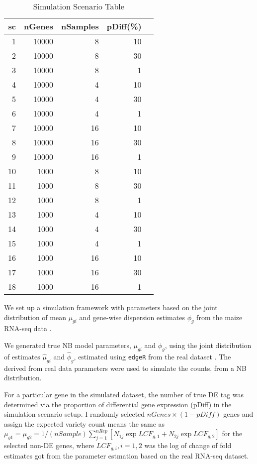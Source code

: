 \begin{table}[H]
\centering
\begin{tabular}{|r|r|r|r|r|}
\hline
sc & nGenes & nSamples & pDiff(\%) \\ 
\hline
1 & 10000 & 8 & 10 \\ 
\hline
2 & 10000 & 8 & 30 \\ 
\hline
3 & 10000 & 8 & 1 \\
\hline
4 & 10000 & 4 & 10 \\
\hline
5 & 10000 & 4 & 30 \\
\hline
6 & 10000 & 4 & 1 \\ 
\hline
7 & 10000 & 16 & 10 \\
\hline
8 & 10000 & 16 & 30 \\ 
\hline
9 & 10000 & 16 & 1 \\
\hline
10& 1000 & 8 & 10 \\
\hline
11 & 1000 & 8 & 30 \\
\hline
12 & 1000 & 8 & 1 \\ 
\hline
13 & 1000 & 4 & 10 \\
\hline
14 & 1000 & 4 & 30 \\
\hline
15 & 1000 & 4 & 1 \\ 
\hline
16 & 1000 & 16 & 10 \\
\hline
17 & 1000 & 16 & 30 \\ 
\hline
18 & 1000 & 16 & 1 \\ 
\hline
\end{tabular}
\caption{Simulation Scenario Table}
\label{tab:Scenario}
\end{table}


We set up a simulation framework with parameters based on the joint distribution of mean $\mu_{gi}$ and gene-wise dispersion estimates $\phi_g$ from the maize RNA-seq data \citep{paschold2012complementation}.

We generated true NB model parameters, $\mu_{gi}$ and $\phi_g$, using the joint distribution of estimates $\hat{\mu}_{gi}$ and $\hat{\phi}_g$, estimated using {\tt edgeR} from the real dataset \citep{paschold2012complementation}. The derived from real data parameters were used to simulate the counts, from a NB distribution. 


For a particular gene in the simulated dataset, the number of true DE tag was determined via the proportion of differential gene expression (pDiff) in the simulation scenario setup. I randomly selected $nGenes \times (1-pDiff)$ genes and assign the expected variety count means the same as $\mu_{g1} = \mu_{g2} = 1/(nSample)\sum_{j=1}^{nRep} \left[ N_{1j}\exp{LCF_{g,1}}+ N_{2j}\exp{LCF_{g,2}} \right]$ for the selected non-DE genes, where $LCF_{g,i}, i=1,2$ was the log of change of fold estimates got from the parameter estmation based on the real RNA-seq dataset.

